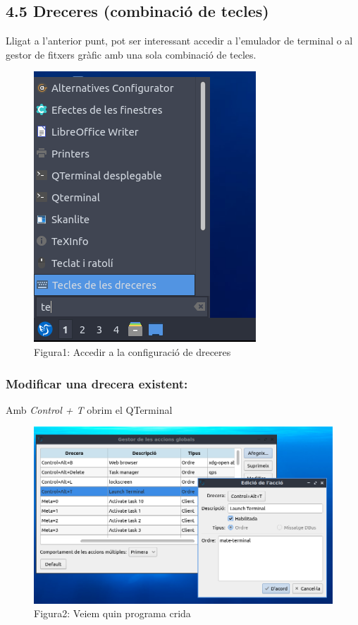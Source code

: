 \documentclass[
  a4paper,
]{article}
\begin{document}
\subsection{4.5 Dreceres (combinació de
tecles)}\label{dreceres-combinaciuxf3-de-tecles}

Lligat a l'anterior punt, pot ser interessant accedir a l'emulador de
terminal o al gestor de fitxers gràfic amb una sola combinació de
tecles.

\begin{figure}
\centering
\includegraphics{png/Drecera0.png}
\caption{Figura1: Accedir a la configuració de dreceres}
\end{figure}

\subsubsection{Modificar una drecera
existent:}\label{modificar-una-drecera-existent}

Amb \emph{Control + T} obrim el QTerminal

\begin{figure}
\centering
\includegraphics{png/Drecera1.png}
\caption{Figura2: Veiem quin programa crida}
\end{figure}
\end{document}
